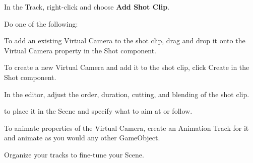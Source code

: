 \begin{DoxyEnumerate}
\item In the  Track, right-\/click and choose {\bfseries{Add  Shot Clip}}.
\item Do one of the following\+:
\begin{DoxyItemize}
\item To add an existing Virtual Camera to the shot clip, drag and drop it onto the Virtual Camera property in the  Shot component.
\item To create a new Virtual Camera and add it to the shot clip, click Create in the  Shot component.
\end{DoxyItemize}
\item In the  editor, adjust the order, duration, cutting, and blending of the shot clip.
\item {} to place it in the Scene and specify what to aim at or follow.
\item To animate properties of the Virtual Camera, create an Animation Track for it and animate as you would any other Game\+Object.
\item Organize your  tracks to fine-\/tune your Scene. 
\end{DoxyEnumerate}